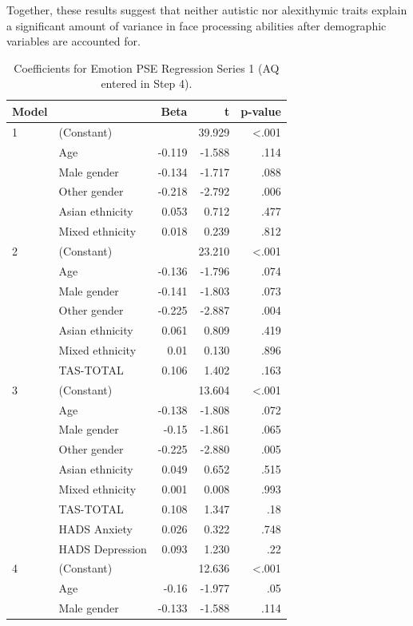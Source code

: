 \documentclass[
]{article}
\begin{document}
Together, these results suggest that neither autistic nor alexithymic traits explain a significant amount of variance in face processing abilities after demographic variables are accounted for.

\begin{table}[H]

\caption{\label{tab:table4}Coefficients for Emotion PSE Regression Series 1 (AQ entered in Step 4).}
\centering
\begin{tabular}[t]{llrrr}
\toprule
Model &  & Beta & t & p-value\\
\midrule
1 & (Constant) &  & 39.929 & <.001\\
 & Age & -0.119 & -1.588 & .114\\
 & Male gender & -0.134 & -1.717 & .088\\
 & Other gender & -0.218 & -2.792 & .006\\
 & Asian ethnicity & 0.053 & 0.712 & .477\\
\addlinespace
 & Mixed ethnicity & 0.018 & 0.239 & .812\\
2 & (Constant) &  & 23.210 & <.001\\
 & Age & -0.136 & -1.796 & .074\\
 & Male gender & -0.141 & -1.803 & .073\\
 & Other gender & -0.225 & -2.887 & .004\\
\addlinespace
 & Asian ethnicity & 0.061 & 0.809 & .419\\
 & Mixed ethnicity & 0.01 & 0.130 & .896\\
 & TAS-TOTAL & 0.106 & 1.402 & .163\\
3 & (Constant) &  & 13.604 & <.001\\
 & Age & -0.138 & -1.808 & .072\\
\addlinespace
 & Male gender & -0.15 & -1.861 & .065\\
 & Other gender & -0.225 & -2.880 & .005\\
 & Asian ethnicity & 0.049 & 0.652 & .515\\
 & Mixed ethnicity & 0.001 & 0.008 & .993\\
 & TAS-TOTAL & 0.108 & 1.347 & .18\\
\addlinespace
 & HADS Anxiety & 0.026 & 0.322 & .748\\
 & HADS Depression & 0.093 & 1.230 & .22\\
4 & (Constant) &  & 12.636 & <.001\\
 & Age & -0.16 & -1.977 & .05\\
 & Male gender & -0.133 & -1.588 & .114\\

\end{tabular}
\end{table}
\end{document}
